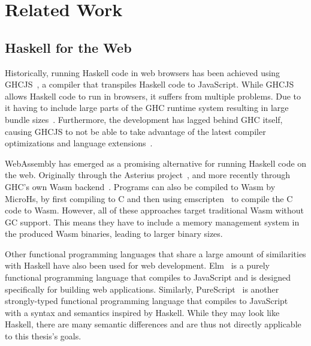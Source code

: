 \chapter{Related Work}\label{ch:related_work}
\section{Haskell for the Web}
Historically, running Haskell code in web browsers has been achieved using GHCJS~\cite{ghcjs}, a compiler that transpiles Haskell code to JavaScript. While GHCJS allows Haskell code to run in browsers, it suffers from multiple problems. Due to it having to include large parts of the GHC runtime system resulting in large bundle sizes~\cite{yorhel}. Furthermore, the development has lagged behind GHC itself, causing GHCJS to not be able to take advantage of the latest compiler optimizations and language extensions~\cite{ghcjs}. 


WebAssembly has emerged as a promising alternative for running Haskell code on the web. Originally through the Asterius project~\cite{asterius}, and more recently through GHC's own Wasm backend~\cite{ghcwasm}. Programs can also be compiled to Wasm by MicroHs, by first compiling to C and then using emscripten~\cite{emscripten} to compile the C code to Wasm. However, all of these approaches target traditional Wasm without GC support. This means they have to include a memory management system in the produced Wasm binaries, leading to larger binary sizes.

Other functional programming languages that share a large amount of similarities with Haskell have also been used for web development. Elm~\cite{elm} is a purely functional programming language that compiles to JavaScript and is designed specifically for building web applications. Similarly, PureScript~\cite{purescript} is another strongly-typed functional programming language that compiles to JavaScript with a syntax and semantics inspired by Haskell. While they may look like Haskell, there are many semantic differences and are thus not directly applicable to this thesis's goals.

